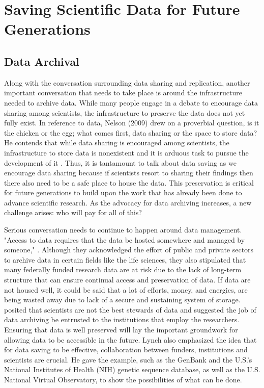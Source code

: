 \documentclass[sigconf]{acmart}
\begin{document}
\section{Saving Scientific Data for Future Generations
}

\subsection{Data Archival}

Along with the conversation surrounding data sharing and replication, another important conversation that needs to take place is around the infrastructure needed to archive data. While many people engage in a debate to encourage data sharing among scientists, the infrastructure to preserve the data does not yet fully exist. In reference to data, Nelson (2009) drew on a proverbial question, is it the chicken or the egg; what comes first, data sharing or the space to store data? He contends that while data sharing is encouraged among scientists, the infrastructure to store data is nonexistent and it is arduous task to pursue the development of it \cite{nelson2009empty}. Thus, it is tantamount to talk about data saving as we encourage data sharing because if scientists resort to sharing their findings then there also need to be a safe place to house the data. This preservation is critical for future generations to build upon the work that has already been done to advance scientific research. As the advocacy for data archiving increases, a new challenge arises: who will pay for all of this?


Serious conversation needs to continue to happen around data management. "Access to data requires that the data be hosted somewhere and managed by someone," \cite{berman2013will}. Although they acknowledged the effort of public and private sectors to archive data in certain fields like the life sciences, they also stipulated that many federally funded research data are at risk due to the lack of long-term structure that can ensure continual access and preservation of data. If data are not housed well, it could be said that a lot of efforts, money, and energies, are being wasted away due to lack of a secure and sustaining system of storage. \cite{lynch2008big} posited that scientists are not the best stewards of data and suggested the job of data archiving be entrusted to the institutions that employ the researchers. Ensuring that data is well preserved will lay the important groundwork for allowing data to be accessible in the future. Lynch also emphasized the idea that for data saving to be effective, collaboration between funders, institutions and scientists are crucial. He gave the example, such as the GenBank and the U.S.'s National Institutes of Health (NIH) genetic sequence database, as well as the U.S. National Virtual Observatory, to show the possibilities of what can be done.
\end{document}
